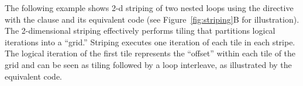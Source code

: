\clearpage

The following example shows 2-d striping of two nested loops using
the  directive with the  clause 
and its equivalent code
(see Figure~\ref{fig:striping}B for illustration).
The 2-dimensional striping effectively performs
tiling that partitions logical iterations into a ``grid.''
Striping executes one iteration of each tile in each stripe.
The logical iteration of the first tile represents the ``offset'' 
within each tile of the grid and can be seen as tiling followed by
a loop interleave, as illustrated by the equivalent code.


